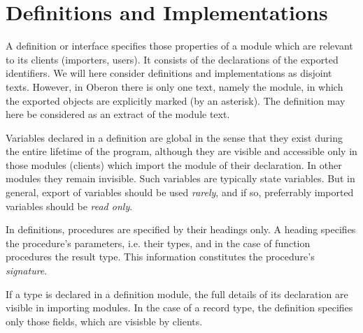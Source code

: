 \chapter{Definitions and Implementations}
A definition or interface specifies those properties of a module which are relevant to its
clients (importers, users). It consists of the declarations of the exported identifiers.
We will here consider definitions and implementations as disjoint texts. However, in Oberon
there is only one text, namely the module, in which the exported objects are explicitly marked
(by an asterisk). The definition may here be considered as an extract of the module text.

Variables declared in a definition are global in the sense that they exist during the entire
lifetime of the program, although they are visible and accessible only in those modules
(clients) which import the module of their declaration. In other modules they remain invisible.
Such variables are typically state variables. But in general, export of variables should
be used \emph{rarely}, and if so, preferrably imported variables should be \emph{read only}.

In definitions, procedures are specified by their headings only. A heading specifies the
procedure’s parameters, i.e. their types, and in the case of function procedures the
result type. This information constitutes the procedure’s \emph{signature}.

If a type is declared in a definition module, the full details of its declaration are
visible in importing modules. In the case of a record type, the definition specifies only
those fields, which are visisble by clients.

